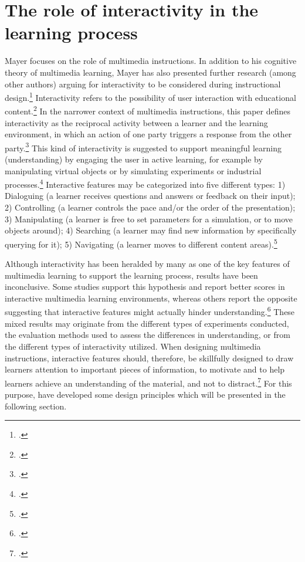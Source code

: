 \section{The role of interactivity in the learning process} \label{sec:Interactivity}
Mayer focuses on the role of multimedia instructions. In addition to his cognitive theory of multimedia learning, Mayer has also presented further research (among other authors) arguing for interactivity to be considered during instructional design.\footcites[Cf.][chapter 2, paragraph 12]{ClarkElearningscienceinstruction2016} Interactivity refers to the possibility of user interaction with educational content.\footcites[Cf.][p.292]{PatwardhanWhendoeshigher2015} In the narrower context of multimedia instructions, this paper defines interactivity as the reciprocal activity between a learner and the learning environment, in which an action of one party triggers a response from the other party.\footcites[Cf.][p.1025]{DomagkInteractivitymultimedialearning2010} This kind of interactivity is suggested to support meaningful learning (understanding) by engaging the user in active learning, for example by manipulating virtual objects or by simulating experiments or industrial processes.\footcites[Cf.][p.161]{CairncrossInteractiveMultimediaLearning2001}[cf.][p.1159]{Evansinteractivityeffectmultimedia2007} Interactive features may be categorized into five different types: 1) Dialoguing (a learner receives questions and answers or feedback on their input); 2) Controlling (a learner controls the pace and/or the order of the presentation); 3) Manipulating (a learner is free to set parameters for a simulation, or to move objects around); 4) Searching (a learner may find new information by specifically querying for it); 5) Navigating (a learner moves to different content areas).\footcites[Cf.][p.311]{MorenoInteractiveMultimodalLearning2007}

Although interactivity has been heralded by many as one of the key features of multimedia learning to support the learning process, results have been inconclusive. Some studies support this hypothesis and report better scores in interactive multimedia learning environments, whereas others report the opposite suggesting that interactive features might actually hinder understanding.\footcites[Cf.][p.1024]{DomagkInteractivitymultimedialearning2010}[cf.][]{MayerWhenLearningJust2001}[cf.][p.156]{CairncrossInteractiveMultimediaLearning2001}[cf.][p. 1148 et seqq]{Evansinteractivityeffectmultimedia2007}[cf.][p.48]{SordenCognitiveTheoryMultimedia2012} These mixed results may originate from the different types of experiments conducted, the evaluation methods used to assess the differences in understanding, or from the different types of interactivity utilized. When designing multimedia instructions, interactive features should, therefore, be skillfully designed to draw learners attention to important pieces of information, to motivate and to help learners achieve an understanding of the material, and not to distract.\footcites[Cf.][p.21]{KirshInteractivitymultimediainterfaces1997}[cf.][p.15]{LeeScreenDesignGuidelines1999} For this purpose, \cite{MorenoInteractiveMultimodalLearning2007} have developed some design principles which will be presented in the following section.

